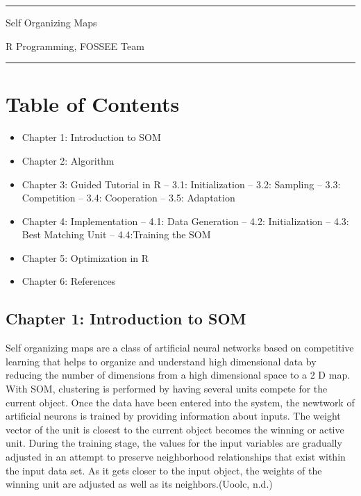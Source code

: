 \documentclass[
]{article}
\author{}
\date{\vspace{-2.5em}}
\providecommand{\tightlist}{%
  \setlength{\itemsep}{0pt}\setlength{\parskip}{0pt}}
\begin{document}
\begin{center}\rule{0.5\linewidth}{0.5pt}\end{center}

Self Organizing Maps

R Programming, FOSSEE Team

\begin{center}\rule{0.5\linewidth}{0.5pt}\end{center}

\hypertarget{table-of-contents}{%
\section{Table of Contents}\label{table-of-contents}}

\begin{itemize}
\tightlist
\item
  Chapter 1: Introduction to SOM
\item
  Chapter 2: Algorithm
\item
  Chapter 3: Guided Tutorial in R -- 3.1: Initialization -- 3.2:
  Sampling -- 3.3: Competition -- 3.4: Cooperation -- 3.5: Adaptation
\item
  Chapter 4: Implementation -- 4.1: Data Generation -- 4.2:
  Initialization -- 4.3: Best Matching Unit -- 4.4:Training the SOM
\item
  Chapter 5: Optimization in R
\item
  Chapter 6: References
\end{itemize}

\hypertarget{chapter-1-introduction-to-som}{%
\subsection{Chapter 1: Introduction to
SOM}\label{chapter-1-introduction-to-som}}

Self organizing maps are a class of artificial neural networks based on
competitive learning that helps to organize and understand high
dimensional data by reducing the number of dimensions from a high
dimensional space to a 2 D map. With SOM, clustering is performed by
having several units compete for the current object. Once the data have
been entered into the system, the newtwork of artificial neurons is
trained by providing information about inputs. The weight vector of the
unit is closest to the current object becomes the winning or active
unit. During the training stage, the values for the input variables are
gradually adjusted in an attempt to preserve neighborhood relationships
that exist within the input data set. As it gets closer to the input
object, the weights of the winning unit are adjusted as well as its
neighbors.(Uoolc, n.d.)
\end{document}
